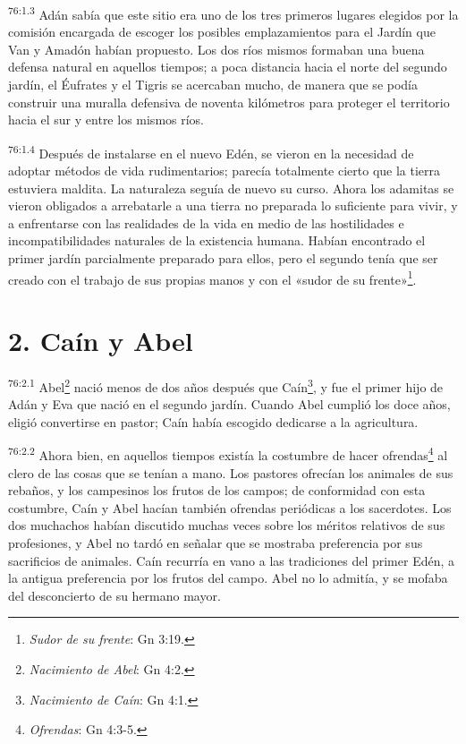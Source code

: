 \par
\textsuperscript{76:1.3} Adán sabía que este sitio era uno de los tres primeros lugares elegidos por la comisión encargada de escoger los posibles emplazamientos para el Jardín que Van y Amadón habían propuesto. Los dos ríos mismos formaban una buena defensa natural en aquellos tiempos; a poca distancia hacia el norte del segundo jardín, el Éufrates y el Tigris se acercaban mucho, de manera que se podía construir una muralla defensiva de noventa kilómetros para proteger el territorio hacia el sur y entre los mismos ríos.

\par
\textsuperscript{76:1.4} Después de instalarse en el nuevo Edén, se vieron en la necesidad de adoptar métodos de vida rudimentarios; parecía totalmente cierto que la tierra estuviera maldita. La naturaleza seguía de nuevo su curso. Ahora los adamitas se vieron obligados a arrebatarle a una tierra no preparada lo suficiente para vivir, y a enfrentarse con las realidades de la vida en medio de las hostilidades e incompatibilidades naturales de la existencia humana. Habían encontrado el primer jardín parcialmente preparado para ellos, pero el segundo tenía que ser creado con el trabajo de sus propias manos y con el «sudor de su frente»\footnote{\textit{Sudor de su frente}: Gn 3:19.}.

\section*{2. Caín y Abel}
\par
\textsuperscript{76:2.1} Abel\footnote{\textit{Nacimiento de Abel}: Gn 4:2.} nació menos de dos años después que Caín\footnote{\textit{Nacimiento de Caín}: Gn 4:1.}, y fue el primer hijo de Adán y Eva que nació en el segundo jardín. Cuando Abel cumplió los doce años, eligió convertirse en pastor; Caín había escogido dedicarse a la agricultura.

\par
\textsuperscript{76:2.2} Ahora bien, en aquellos tiempos existía la costumbre de hacer ofrendas\footnote{\textit{Ofrendas}: Gn 4:3-5.} al clero de las cosas que se tenían a mano. Los pastores ofrecían los animales de sus rebaños, y los campesinos los frutos de los campos; de conformidad con esta costumbre, Caín y Abel hacían también ofrendas periódicas a los sacerdotes. Los dos muchachos habían discutido muchas veces sobre los méritos relativos de sus profesiones, y Abel no tardó en señalar que se mostraba preferencia por sus sacrificios de animales. Caín recurría en vano a las tradiciones del primer Edén, a la antigua preferencia por los frutos del campo. Abel no lo admitía, y se mofaba del desconcierto de su hermano mayor.

